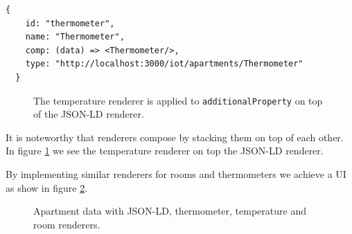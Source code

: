 \lstset{language=JSON}
\begin{lstlisting}[caption=Renderer configuration that the developer provides., label=lst:rendererconfig]
  {
    id: "thermometer",
    name: "Thermometer",
    comp: (data) => <Thermometer/>,
    type: "http://localhost:3000/iot/apartments/Thermometer"
  }
\end{lstlisting}

\begin{figure}[!htb]
  \caption{The temperature renderer is applied to \lstinline{additionalProperty} on top of the JSON-LD renderer.}
  \label{fig:temperature}
\end{figure}

It is noteworthy that renderers compose by stacking them on top of each other. In figure \ref{fig:temperature} we see the temperature renderer on top the JSON-LD renderer.

By implementing similar renderers for rooms and thermometers we achieve a UI as show in figure \ref{fig:rooms}.

\clearpage

\begin{figure}[!htb]
  \caption{Apartment data with JSON-LD, thermometer, temperature and room renderers.}
  \label{fig:rooms}
\end{figure}

